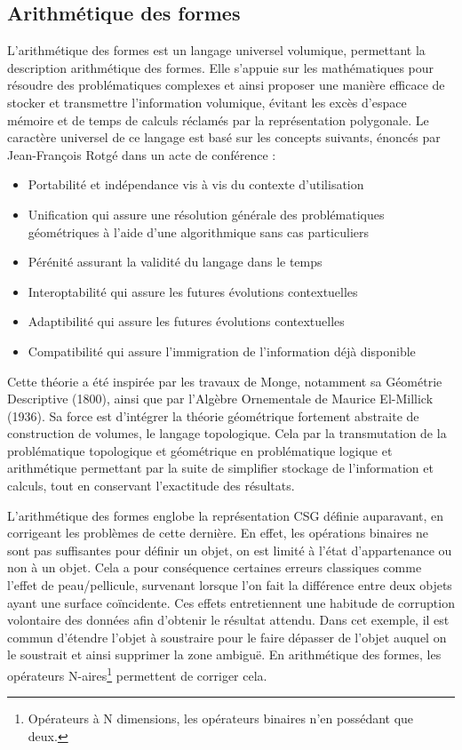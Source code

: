 \documentclass{tnreport}
\begin{document}
\subsection{Arithmétique des formes}
\label{subsec:arithform}
L'arithmétique des formes est un langage universel volumique, permettant la description arithmétique des formes. Elle s'appuie sur les mathématiques pour résoudre des problématiques complexes et ainsi proposer une manière efficace de stocker et transmettre l'information volumique, évitant les excès d'espace mémoire et de temps de calculs réclamés par la représentation polygonale. Le caractère universel de ce langage est basé sur les concepts suivants, énoncés par Jean-François Rotgé dans un acte de conférence :
\begin{itemize}
    \item Portabilité et indépendance vis à vis du contexte d'utilisation
    \item Unification qui assure une résolution générale des problématiques géométriques à l'aide d'une algorithmique sans cas particuliers
    \item Pérénité assurant la validité du langage dans le temps
    \item Interoptabilité qui assure les futures évolutions contextuelles
    \item Adaptibilité qui assure les futures évolutions contextuelles
    \item Compatibilité qui assure l'immigration de l'information déjà disponible
\end{itemize}
Cette théorie a été inspirée par les travaux de Monge, notamment sa Géométrie Descriptive (1800), ainsi que par l'Algèbre Ornementale de Maurice El-Millick (1936). Sa force est d'intégrer la théorie géométrique fortement abstraite de construction de volumes, le langage topologique. Cela par la transmutation de la problématique topologique et géométrique en problématique logique et arithmétique permettant par la suite de simplifier stockage de l'information et calculs, tout en conservant l'exactitude des résultats.

L'arithmétique des formes englobe la représentation CSG définie auparavant, en corrigeant les problèmes de cette dernière. En effet, les opérations binaires ne sont pas suffisantes pour définir un objet, on est limité à l'état d'appartenance ou non à un objet. Cela a pour conséquence certaines erreurs classiques comme l'effet de peau/pellicule, survenant lorsque l'on fait la différence entre deux objets ayant une surface coïncidente. Ces effets entretiennent une habitude de corruption volontaire des données afin d'obtenir le résultat attendu. Dans cet exemple, il est commun d'étendre l'objet à soustraire pour le faire dépasser de l'objet auquel on le soustrait et ainsi supprimer la zone ambiguë. En arithmétique des formes, les opérateurs N-aires\footnote{Opérateurs à N dimensions, les opérateurs binaires n'en possédant que deux.} permettent de corriger cela.
\end{document}
